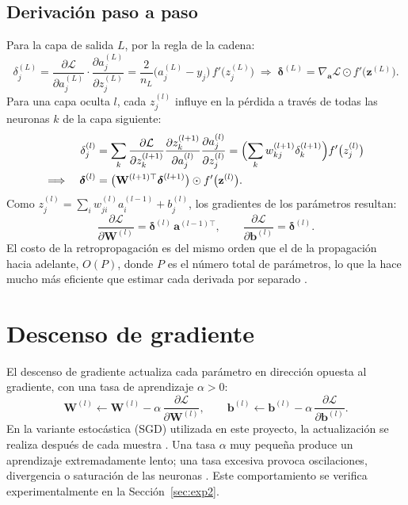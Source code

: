 \subsection{Derivación paso a paso}
Para la capa de salida $L$, por la regla de la cadena:
\begin{equation}
\delta_j^{(L)} = \frac{\partial\mathcal{L}}{\partial a_j^{(L)}}\cdot\frac{\partial a_j^{(L)}}{\partial z_j^{(L)}} = \frac{2}{n_L}\bigl(a_j^{(L)}-y_j\bigr)\, f'\bigl(z_j^{(L)}\bigr)
\;\Longrightarrow\; \boldsymbol{\delta}^{(L)} = \nabla_{\mathbf{a}}\mathcal{L}\odot f'\bigl(\mathbf{z}^{(L)}\bigr).\label{eq:deltaL}
\end{equation}
Para una capa oculta $l$, cada $z_j^{(l)}$ influye en la pérdida a través de todas las neuronas $k$ de la capa siguiente:
\begin{equation}
\begin{split}
\delta_j^{(l)} &= \sum_{k}\frac{\partial\mathcal{L}}{\partial z_k^{(l+1)}}\frac{\partial z_k^{(l+1)}}{\partial a_j^{(l)}}\frac{\partial a_j^{(l)}}{\partial z_j^{(l)}} = \Bigl(\sum_k w_{kj}^{(l+1)}\delta_k^{(l+1)}\Bigr) f'\bigl(z_j^{(l)}\bigr)\\
\Longrightarrow\quad \boldsymbol{\delta}^{(l)} &= \bigl(\mathbf{W}^{(l+1)\top}\boldsymbol{\delta}^{(l+1)}\bigr)\odot f'\bigl(\mathbf{z}^{(l)}\bigr).
\end{split}\label{eq:deltal}
\end{equation}
Como $z_j^{(l)} = \sum_i w_{ji}^{(l)}a_i^{(l-1)} + b_j^{(l)}$, los gradientes de los parámetros resultan:
\begin{equation}
\frac{\partial\mathcal{L}}{\partial\mathbf{W}^{(l)}} = \boldsymbol{\delta}^{(l)}\,\mathbf{a}^{(l-1)\top}, \qquad \frac{\partial\mathcal{L}}{\partial\mathbf{b}^{(l)}} = \boldsymbol{\delta}^{(l)}.\label{eq:gradW}
\end{equation}
El costo de la retropropagación es del mismo orden que el de la propagación hacia adelante, $O(P)$, donde $P$ es el número total de parámetros, lo que la hace mucho más eficiente que estimar cada derivada por separado \citep{baydin2018}.

\section{Descenso de gradiente}
El descenso de gradiente actualiza cada parámetro en dirección opuesta al gradiente, con una tasa de aprendizaje $\alpha>0$:
\begin{equation}
\mathbf{W}^{(l)} \leftarrow \mathbf{W}^{(l)} - \alpha\,\frac{\partial\mathcal{L}}{\partial\mathbf{W}^{(l)}}, \qquad \mathbf{b}^{(l)} \leftarrow \mathbf{b}^{(l)} - \alpha\,\frac{\partial\mathcal{L}}{\partial\mathbf{b}^{(l)}}.\label{eq:gd}
\end{equation}
En la variante estocástica (SGD) utilizada en este proyecto, la actualización se realiza después de cada muestra \citep{bottou2010}. Una tasa $\alpha$ muy pequeña produce un aprendizaje extremadamente lento; una tasa excesiva provoca oscilaciones, divergencia o saturación de las neuronas \citep{ruder2016}. Este comportamiento se verifica experimentalmente en la Sección~\ref{sec:exp2}.

